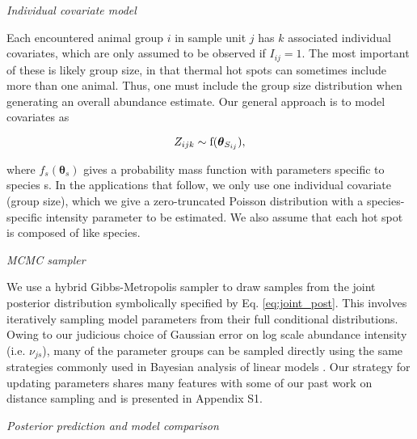 \documentclass[12pt,fleqn]{article}
\begin{document}
\begin{flushleft}
\vspace{.15in}
{\it Individual covariate model} \\
\vspace{.15in}

Each encountered animal group $i$ in sample unit $j$ has $k$ associated individual covariates, which are only assumed to be observed if $I_{ij}=1$.  The most important of these
is likely group size, in that thermal hot spots can sometimes include more than one animal.  Thus, one must include the group size distribution when generating an overall abundance estimate.  Our general approach is to
model covariates as
\begin{linenomath*}
\begin{equation*}
  Z_{ijk} \sim {\rm f}(\boldsymbol{\theta}_{S_{ij}}),
\end{equation*}
\end{linenomath*}
where $f_s(\boldsymbol{\theta}_s)$ gives a probability mass function with parameters specific to species s.  In the applications that follow, we only use one individual covariate (group size), which we give a zero-truncated Poisson distribution with a species-specific intensity parameter to be estimated.  We also assume that each
hot spot is composed of like species.

\vspace{.15in}
{\it MCMC sampler} \\
\vspace{.15in}

We use a hybrid Gibbs-Metropolis sampler to draw samples from the joint posterior distribution symbolically specified by Eq. \ref{eq:joint_post}.  This involves iteratively sampling model parameters from their full conditional distributions.  Owing to our judicious choice of Gaussian error on log scale abundance intensity (i.e. $\nu_{js}$), many of the parameter groups can be sampled directly using the same strategies commonly used in Bayesian analysis of linear models \cite[see e.g.][Chapter 14]{GelmanEtAl2004}.  Our strategy for updating parameters shares many features with some of our past work on distance sampling \citep[see e.g.][]{ConnEtAl2012,ConnEtAl2013} and is presented in Appendix S1.

\vspace{.15in}
{\it Posterior prediction and model comparison} \\
\vspace{.15in}


\end{flushleft}
\end{document}
